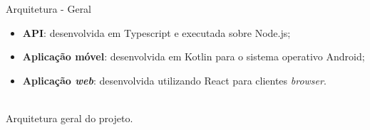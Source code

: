 \begin{frame}{Arquitetura - Geral}

\vspace*{-3em}

\begin{itemize}
	\item \textbf{API}: desenvolvida em Typescript e executada sobre Node.js;
	\item \textbf{Aplicação móvel}: desenvolvida em Kotlin para o sistema operativo Android;
	\item \textbf{Aplicação \textit{web}}: desenvolvida utilizando React para clientes \textit{browser}.
\end{itemize}

\centering
{}\\

{\small Arquitetura geral do projeto.}

\end{frame}





